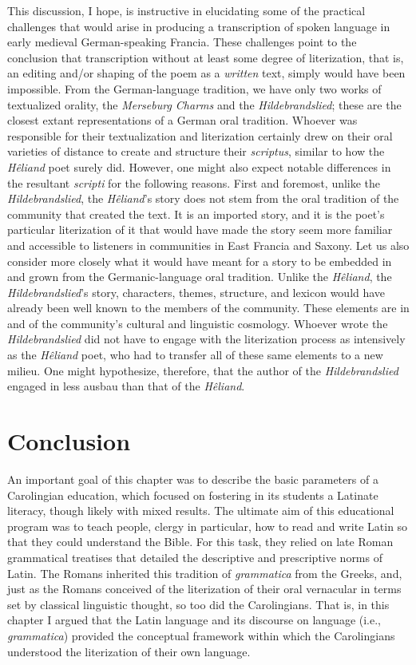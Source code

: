   This discussion, I hope, is instructive in elucidating some of the practical challenges that would arise in producing a transcription of spoken language in early medieval German-speaking Francia. These challenges point to the conclusion that transcription without at least some degree of literization, that is, an editing and/or shaping of the poem as a \textit{written} text, simply would have been impossible. From the German-language tradition, we have only two works of textualized orality, the \textit{Merseburg Charms} and the \textit{Hildebrandslied}; these are the closest extant representations of a German oral tradition. Whoever was responsible for their textualization and literization certainly drew on their oral varieties of distance to create and structure their \textit{scriptus}, similar to how the \textit{Hêliand} poet surely did. However, one might also expect notable differences in the resultant \textit{scripti} for the following reasons. First and foremost, unlike the \textit{Hildebrandslied}, the \textit{Hêliand}’s story does not stem from the oral tradition of the community that created the text. It is an imported story, and it is the poet’s particular literization of it that would have made the story seem more familiar and accessible to listeners in communities in East Francia and Saxony. Let us also consider more closely what it would have meant for a story to be embedded in and grown from the Germanic-language oral tradition. Unlike the \textit{Hêliand}, the \textit{Hildebrandslied}’s story, characters, themes, structure, and lexicon would have already been well known to the members of the community. These elements are in and of the community’s cultural and linguistic cosmology. Whoever wrote the \textit{Hildebrandslied} did not have to engage with the literization process as intensively as the \textit{Hêliand} poet, who had to transfer all of these same elements to a new milieu. One might hypothesize, therefore, that the author of the \textit{Hildebrandslied} engaged in less ausbau than that of the \textit{Hêliand}.

\section{Conclusion}\label{sec:5.4}

An important goal of this chapter was to describe the basic parameters of a Carolingian education, which focused on fostering in its students a Latinate literacy, though likely with mixed results. The ultimate aim of this educational program was to teach people, clergy in particular, how to read and write Latin so that they could understand the Bible. For this task, they relied on late Roman grammatical treatises that detailed the descriptive and prescriptive norms of Latin. The Romans inherited this tradition of \textit{grammatica} from the Greeks, and, just as the Romans conceived of the literization of their oral vernacular in terms set by classical linguistic thought, so too did the Carolingians. That is, in this chapter I argued that the Latin language and its discourse on language (i.e., \textit{grammatica}) provided the conceptual framework within which the Carolingians understood the literization of their own language.

